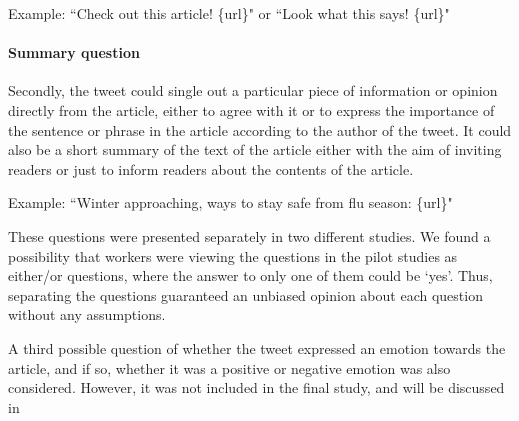 Example: ``Check out this article! \{url\}" or ``Look what this says! \{url\}"

\paragraph{Summary question} Secondly, the tweet could single out a particular piece of information or opinion directly from the article, either to agree with it or to express the importance of the sentence or phrase in the article according to the author of the tweet. It could also be a short summary of the text of the article either with the aim of inviting readers or just to inform readers about the contents of the article.

Example: ``Winter approaching, ways to stay safe from flu season: \{url\}"

These questions were presented separately in two different studies. We found a possibility that workers were viewing the questions in the pilot studies as either/or questions, where the answer to only one of them could be `yes'. Thus, separating the questions guaranteed an unbiased opinion about each question without any assumptions.

A third possible question of whether the tweet expressed an emotion towards the article, and if so, whether it was a positive or negative emotion was also considered. However, it was not included in the final study, and will be discussed in 





